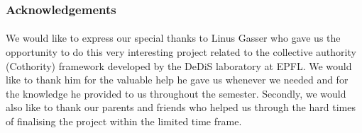 \subsubsection*{Acknowledgements}

\paragraph{}
We would like to express our special thanks to Linus Gasser who gave us the opportunity to do this very interesting project related to the collective authority (Cothority) framework developed by the DeDiS laboratory at EPFL. We would like to thank him for the valuable help he gave us whenever we needed and for the knowledge he provided to us throughout the semester.
Secondly, we would also like to thank our parents and friends who helped us through the hard times of finalising the project within the limited time frame.
